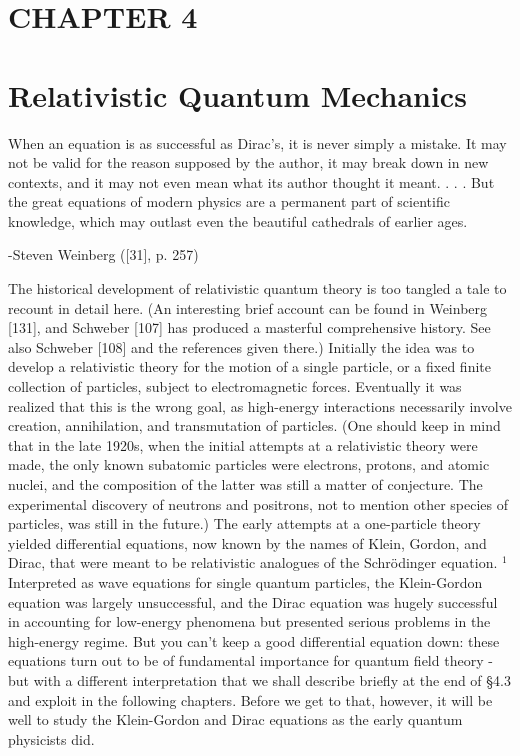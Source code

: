 \documentclass[10pt, letterpaper]{article}
\begin{document}
\section*{CHAPTER 4}
\section*{Relativistic Quantum Mechanics}
\begin{displayquote}
When an equation is as successful as Dirac's, it is never simply a mistake. It may not be valid for the reason supposed by the author, it may break down in new contexts, and it may not even mean what its author thought it meant. . . . But the great equations of modern physics are a permanent part of scientific knowledge, which may outlast even the beautiful cathedrals of earlier ages.
\end{displayquote}

-Steven Weinberg ([31], p. 257)

The historical development of relativistic quantum theory is too tangled a tale to recount in detail here. (An interesting brief account can be found in Weinberg [131], and Schweber [107] has produced a masterful comprehensive history. See also Schweber [108] and the references given there.) Initially the idea was to develop a relativistic theory for the motion of a single particle, or a fixed finite collection of particles, subject to electromagnetic forces. Eventually it was realized that this is the wrong goal, as high-energy interactions necessarily involve creation, annihilation, and transmutation of particles. (One should keep in mind that in the late 1920s, when the initial attempts at a relativistic theory were made, the only known subatomic particles were electrons, protons, and atomic nuclei, and the composition of the latter was still a matter of conjecture. The experimental discovery of neutrons and positrons, not to mention other species of particles, was still in the future.) The early attempts at a one-particle theory yielded differential equations, now known by the names of Klein, Gordon, and Dirac, that were meant to be relativistic analogues of the Schrödinger equation. ${ }^{1}$ Interpreted as wave equations for single quantum particles, the Klein-Gordon equation was largely unsuccessful, and the Dirac equation was hugely successful in accounting for low-energy phenomena but presented serious problems in the high-energy regime. But you can't keep a good differential equation down: these equations turn out to be of fundamental importance for quantum field theory - but with a different interpretation that we shall describe briefly at the end of §4.3 and exploit in the following chapters. Before we get to that, however, it will be well to study the Klein-Gordon and Dirac equations as the early quantum physicists did.
\end{document}
